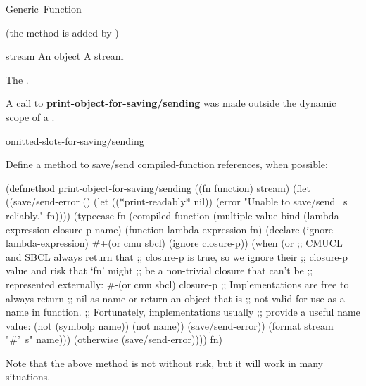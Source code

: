 \documentclass[10pt,twoside,english,pdftex]{article}
\begin{document}
\begin{functiondoc}{Generic~Function}
\fnpackage {}

\fnmodule {} (the  method is added by
)

\fnargs
\begin{args}{stream}
\arg[object] An object
\arg[stream] A stream
\end{args}

\fnreturns The .

\fnerrors A call to \textbf{print-object-for-saving/sending} was made outside
the dynamic scope of a \textbf{}.

\begin{alsos}{omitted-slots-for-saving/sending}
\end{alsos}

\fnexample Define a method to save/send compiled-function references,
when possible:
%
\W\supp
\begin{example}
  (defmethod print-object-for-saving/sending ((fn function)
                                              stream)
    (flet ((save/send-error ()
             (let ((*print-readably* nil))
               (error "Unable to save/send ~s reliably." fn))))
      (typecase fn
        (compiled-function
         (multiple-value-bind (lambda-expression closure-p name)
             (function-lambda-expression fn)
           (declare (ignore lambda-expression)
                    #+(or cmu sbcl)
                    (ignore closure-p))
           (when (or 
                  ;; CMUCL and SBCL always return that
                  ;; closure-p is true, so we ignore their
                  ;; closure-p value and risk that `fn' might
                  ;; be a non-trivial closure that can't be
                  ;; represented externally:
                  #-(or cmu sbcl)
                  closure-p
                  ;; Implementations are free to always return
                  ;; nil as name or return an object that is
                  ;; not valid for use as a name in function.
                  ;; Fortunately, implementations usually
                  ;; provide a useful name value:
                  (not (symbolp name))
                  (not name))
             (save/send-error))
           (format stream "#'~s" name)))
        (otherwise (save/send-error))))
    fn)
\end{example}
Note that the above method is not without risk, but it will work in
many situations.
\end{functiondoc}
\end{document}
